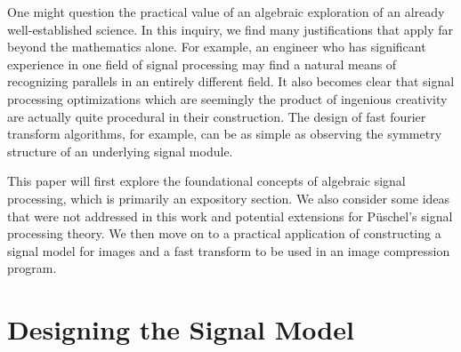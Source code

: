 \documentclass[12pt,technote]{IEEEtran}
\begin{document}
One might question the practical value of an algebraic exploration of an already well-established science. In this inquiry, we find many justifications that apply far beyond the mathematics alone. For example, an engineer who has significant experience in one field of signal processing may find a natural means of recognizing parallels in an entirely different field. It also becomes clear that signal processing optimizations which are seemingly the product of ingenious creativity are actually quite procedural in their construction. The design of fast fourier transform algorithms, for example, can be as simple as observing the symmetry structure of an underlying signal module.

This paper will first explore the foundational concepts of algebraic signal processing, which is primarily an expository section. We also consider some ideas that were not addressed in this work and potential extensions for P\"uschel's signal processing theory. We then move on to a practical application of constructing a signal model for images and a fast transform to be used in an image compression program.
\section{Designing the Signal Model}
\end{document}
